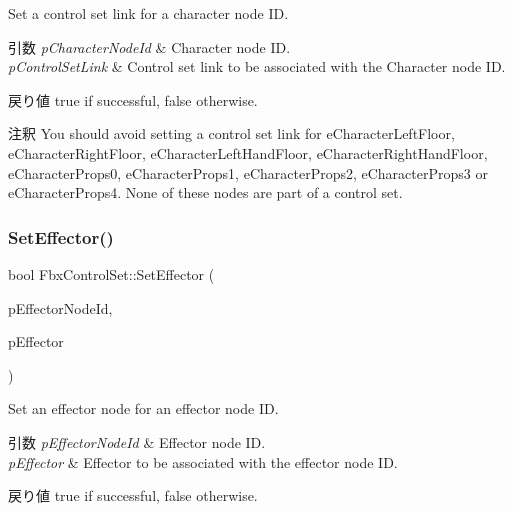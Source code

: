Set a control set link for a character node ID. 
\begin{DoxyParams}{引数}
{\em p\+Character\+Node\+Id} & Character node ID. \\
\hline
{\em p\+Control\+Set\+Link} & Control set link to be associated with the Character node ID. \\
\hline
\end{DoxyParams}
\begin{DoxyReturn}{戻り値}
{\ttfamily true} if successful, {\ttfamily false} otherwise. 
\end{DoxyReturn}
\begin{DoxyRemark}{注釈}
You should avoid setting a control set link for e\+Character\+Left\+Floor, e\+Character\+Right\+Floor, e\+Character\+Left\+Hand\+Floor, e\+Character\+Right\+Hand\+Floor, e\+Character\+Props0, e\+Character\+Props1, e\+Character\+Props2, e\+Character\+Props3 or e\+Character\+Props4. None of these nodes are part of a control set. 
\end{DoxyRemark}
\mbox{\label{class_fbx_control_set_aa274b9d69d66d7d00d7769683e275922}} 
\subsubsection{\texorpdfstring{Set\+Effector()}{SetEffector()}}
{\footnotesize\ttfamily bool Fbx\+Control\+Set\+::\+Set\+Effector (\begin{DoxyParamCaption}\item[{\hyperlink{class_fbx_effector_a26afd81fd3d41431311004c16536e739}{Fbx\+Effector\+::\+E\+Node\+Id}}]{p\+Effector\+Node\+Id,  }\item[{\hyperlink{class_fbx_effector}{Fbx\+Effector}}]{p\+Effector }\end{DoxyParamCaption})}

Set an effector node for an effector node ID. 
\begin{DoxyParams}{引数}
{\em p\+Effector\+Node\+Id} & Effector node ID. \\
\hline
{\em p\+Effector} & Effector to be associated with the effector node ID. \\
\hline
\end{DoxyParams}
\begin{DoxyReturn}{戻り値}
{\ttfamily true} if successful, {\ttfamily false} otherwise. 
\end{DoxyReturn}
\mbox{\label{class_fbx_control_set_a8c47b6a7efb2c9d086467397ef573f38}} 
